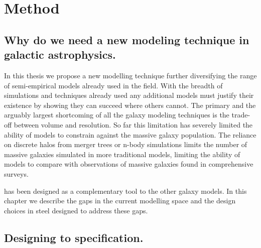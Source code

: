 
\chapter{Method} %
\label{Chapter:Method}

\section{Why do we need a new modeling technique in galactic astrophysics.}
In this thesis we propose a new modelling technique further diversifying the range of semi-empirical models already used in the field. With the breadth of simulations and techniques already used any additional models must justify their existence by showing they can succeed where others cannot. The primary and the arguably largest shortcoming of all the galaxy modeling techniques is the trade-off between volume and resolution. So far this limitation has severely limited the ability of models to constrain against the massive galaxy population. The reliance on discrete halos from merger trees or n-body simulations limits the number of massive galaxies simulated in more traditional models, limiting the ability of models to compare with observations of massive galaxies found in comprehensive surveys. 

\steel has been designed as a complementary tool to the other galaxy models. In this chapter we describe the gaps in the current modelling space and the design choices in steel designed to address these gaps.

\section{Designing to specification.}
